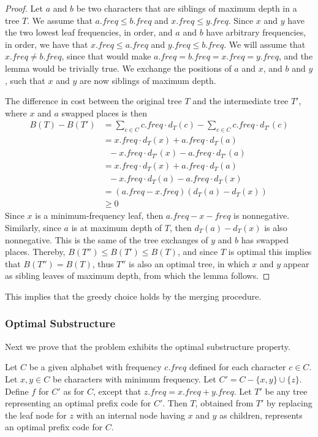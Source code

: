 \begin{proof}
	Let $a$ and $b$ be two characters that are siblings of maximum depth in a
	tree $T$. We assume that $a.freq \leq b.freq$ and $x.freq \leq y.freq$.
	Since $x$ and $y$ have the two lowest leaf frequencies, in order, and $a$
	and $b$ have arbitrary frequencies, in order, we have that $x.freq \leq
	a.freq$ and $y.freq \leq b.freq$. We will assume that $x.freq \neq
	b.freq$, since that would make $a.freq = b.freq = x.freq = y.freq$, and
	the lemma would be trivially true. We exchange the positions of $a$ and
	$x$, and $b$ and $y$, such that $x$ and $y$ are now siblings of maximum
	depth.

	The difference in cost between the original tree $T$ and the intermediate
	tree $T'$, where $x$ and $a$ swapped places is then
	\begin{align}
		B(T) - B(T') &= \sum_{c \in C} c.freq \cdot d_T(c)
		- \sum_{c \in C} c.freq \cdot d_{T'}(c) \\
		&= x.freq \cdot d_T(x) + a.freq \cdot d_T(a) \\
		&{\ \ \ }- x.freq \cdot d_{T'}(x) - a.freq \cdot d_{T'}(a) \\
		&= x.freq \cdot d_T(x) + a.freq \cdot d_T(a) \\
		&{\ \ \ }- x.freq \cdot d_{T}(a) - a.freq \cdot d_{T}(x) \\
		&= (a.freq - x.freq)(d_T(a) - d_T(x)) \\
		&\geq 0 
	\end{align}
	Since $x$ is a minimum-frequency leaf, then $a.freq - x-freq$ is
	nonnegative. Similarly, since $a$ is at maximum depth of $T$, then $d_T(a)
	- d_T(x)$ is also nonnegative. This is the same of the tree exchanges of
	$y$ and $b$ has swapped places. Thereby, $B(T'') \leq B(T') \leq B(T)$,
	and since $T$ is optimal this implies that $B(T'') = B(T)$, thus $T''$ is
	also an optimal tree, in which $x$ and $y$ appear as sibling leaves of
	maximum depth, from which the lemma follows.
\end{proof}
This implies that the greedy choice holds by the merging procedure.

\subsubsection{Optimal Substructure}
Next we prove that the problem exhibits the optimal substructure property.
\begin{lemma} \cite[16.3, p. 435]{clrs}
\textnormal
{
	Let $C$ be a given alphabet with frequency $c.freq$ defined for each
	character $c \in C$. Let $x, y \in C$ be characters with minimum frequency.
	Let $C' = C - \{x, y\} \cup \{z\}$. Define $f$ for $C'$ as for $C$, except
	that $z.freq = x.freq + y.freq$. Let $T'$ be any tree representing an
	optimal prefix code for $C'$. Then $T$, obtained from $T'$ by replacing
	the leaf node for $z$ with an internal node having $x$ and $y$ as children,
	represents an optimal prefix code for $C$.
}
\end{lemma}


